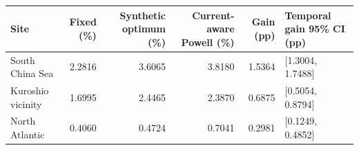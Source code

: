\begin{tabular}{lrrrrl}
\toprule
Site & Fixed (\%) & Synthetic optimum (\%) & Current-aware Powell (\%) & Gain (pp) & Temporal gain 95\% CI (pp) \\
\midrule
South China Sea & 2.2816 & 3.6065 & 3.8180 & 1.5364 & [1.3004, 1.7488] \\
Kuroshio vicinity & 1.6995 & 2.4465 & 2.3870 & 0.6875 & [0.5054, 0.8794] \\
North Atlantic & 0.4060 & 0.4724 & 0.7041 & 0.2981 & [0.1249, 0.4852] \\
\bottomrule
\end{tabular}

